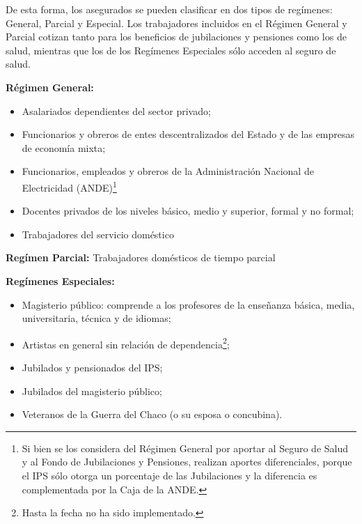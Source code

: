 De esta forma, los asegurados se pueden clasificar en dos tipos de regímenes: General, Parcial y Especial. Los trabajadores incluidos en el Régimen General y Parcial cotizan tanto para los beneficios de jubilaciones y pensiones como los de salud, mientras que los de los Regímenes Especiales sólo acceden al seguro de salud.

\textbf{Régimen General:}

\begin {itemize}

\item Asalariados dependientes del sector privado; 

\item Funcionarios y obreros de entes descentralizados del Estado y de las empresas de economía mixta;

\item Funcionarios, empleados y obreros de la Administración Nacional de Electricidad (ANDE)\footnote{ Si bien se los considera del Régimen General por aportar al Seguro de Salud y al Fondo de Jubilaciones y Pensiones, realizan aportes diferenciales, porque el IPS sólo otorga un porcentaje de las Jubilaciones y la diferencia es complementada por la Caja de la ANDE.}

\item Docentes privados de los niveles básico, medio y superior, formal y no formal;

\item Trabajadores del servicio doméstico

\end{itemize}

\textbf{Regímen Parcial:} Trabajadores domésticos de tiempo parcial

\textbf{Regímenes Especiales:}

\begin{itemize}


\item Magisterio público: comprende a los profesores de la enseñanza básica, media, universitaria, técnica y de idiomas;

 \item Artistas en general sin relación de dependencia\footnote{ Hasta la fecha no ha sido implementado.};
 
 \item Jubilados y pensionados del IPS;
 
 \item Jubilados del magisterio público;
 
 \item Veteranos de la Guerra del Chaco (o su esposa o concubina).
 
\end{itemize}

